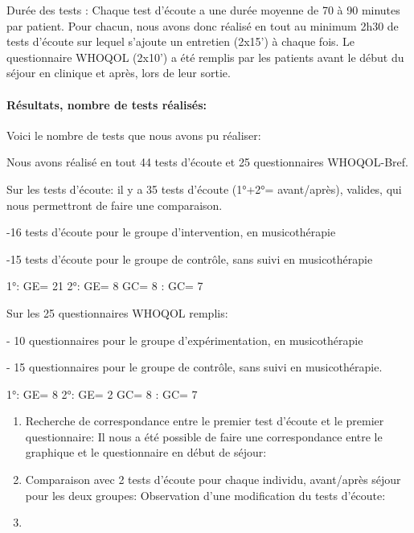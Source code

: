 	
	
	Durée des tests : Chaque test d'écoute a une durée  moyenne de
        70 à 90 minutes par patient. Pour chacun, nous avons donc réalisé
        en tout au minimum 2h30 de tests d'écoute sur lequel
        s'ajoute un
        entretien (2x15') à chaque fois.
        Le questionnaire WHOQOL (2x10')  a été remplis par les
        patients avant le début du séjour en clinique et après, lors
        de leur sortie.
        
       
      
      \paragraph{Résultats, nombre de tests réalisés:}


        
        Voici le nombre de tests que nous avons pu réaliser:
        
     Nous avons réalisé en tout 44 tests d'écoute et 25 questionnaires 
     WHOQOL-Bref.
     
     Sur les tests d'écoute: il y a 35 tests d'écoute (1°+2°=
     avant/après), valides, qui nous permettront de faire une comparaison.
     
     -16 tests d'écoute pour le groupe d'intervention, en musicothérapie
     
     -15 tests d'écoute pour le groupe de contrôle, sans suivi en 
     musicothérapie

     1°: GE= 21                        2°: GE= 8
           GC= 8                            : GC= 7

     
           Sur les 25  questionnaires WHOQOL remplis:
           
     - 10 questionnaires pour le groupe d'expérimentation, en musicothérapie
     
     - 15 questionnaires pour le groupe de contrôle, sans suivi en 
     musicothérapie.

     
     1°: GE= 8                        2°: GE= 2
           GC= 8                            : GC= 7
     
     
           \begin{enumerate}
             
        \item Recherche de correspondance entre le premier test d'écoute et
     le premier questionnaire: Il nous a été possible de faire une
     correspondance entre le graphique et le questionnaire en début de
     séjour:


     
     
        \item Comparaison avec 2 tests d'écoute pour chaque individu,
          avant/après séjour pour les deux groupes:
          Observation d'une modification du tests d'écoute:


          
        
        \item
\end{enumerate}

